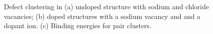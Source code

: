\documentclass[12pt]{report}
\begin{document}
\begin{figure}
\centering
    \hspace{1cm}
    
\caption{Defect clustering in  (a) undoped structure with sodium and chloride vacancies; (b) doped structures with a sodium vacancy and and a dopant ion. (c) Binding energies for pair clusters.}
\label{clustering}
\end{figure}
\end{document}
